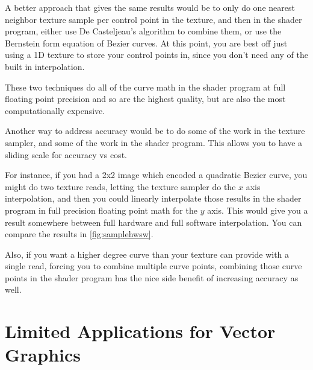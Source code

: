 \documentclass{jcgt}
\begin{document}
A better approach that gives the same results would be to only do one nearest neighbor texture sample per control point in the texture, and then in the shader program, either use De Casteljeau's algorithm to combine them, or use the Bernstein form equation of Bezier curves.  At this point, you are best off just using a 1D texture to store your control points in, since you don't need any of the built in interpolation.

These two techniques do all of the curve math in the shader program at full floating point precision and so are the highest quality, but are also the most computationally expensive.

Another way to address accuracy would be to do some of the work in the texture sampler, and some of the work in the shader program.  This allows you to have a sliding scale for accuracy vs cost.

For instance, if you had a 2x2 image which encoded a quadratic Bezier curve, you might do two texture reads, letting the texture sampler do the $x$ axis interpolation, and then you could linearly interpolate those results in the shader program in full precision floating point math for the $y$ axis.  This would give you a result somewhere between full hardware and full software interpolation.  You can compare the results in \autoref{fig:samplehwsw}.

Also, if you want a higher degree curve than your texture can provide with a single read, forcing you to combine multiple curve points, combining those curve points in the shader program has the nice side benefit of increasing accuracy as well.

\section{Limited Applications for Vector Graphics}
\label{sec:limitedapplicationsforvectorgraphics}
\end{document}

